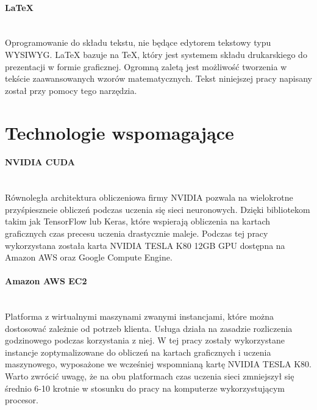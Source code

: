 \paragraph{LaTeX} \mbox{}\\
Oprogramowanie do składu tekstu, nie będące edytorem tekstowy typu WYSIWYG.
LaTeX bazuje na TeX, który jest systemem składu drukarskiego do prezentacji w
formie graficznej. Ogromną zaletą jest możliwość tworzenia w tekście zaawansowanych
wzorów matematycznych. Tekst niniejszej pracy napisany został przy pomocy tego narzędzia.

\section{Technologie wspomagające}

\paragraph{NVIDIA CUDA} \mbox{}\\
Równoległa architektura obliczeniowa firmy NVIDIA pozwala na wielokrotne
przyśpieszneie obliczeń podczas uczenia się sieci neuronowych. Dzięki bibliotekom
takim jak TensorFlow lub Keras, które wspierają obliczenia na kartach graficznych
czas precesu uczenia drastycznie maleje. Podczas tej pracy wykorzystana została
karta NVIDIA TESLA K80 12GB GPU dostępna na Amazon AWS oraz Google Compute Engine.

\paragraph{Amazon AWS EC2} \mbox{}\\
Platforma z wirtualnymi maszynami zwanymi instancjami, które można dostosować
zależnie od potrzeb klienta. Usługa działa na zasadzie rozliczenia godzinowego
podczas korzystania z niej. W tej pracy zostały wykorzystane instancje
zoptymalizowane do obliczeń na kartach graficznych i uczenia maszynowego,
wyposażone we wcześniej wspomnianą kartę NVIDIA TESLA K80. Warto
zwrócić uwagę, że na obu platformach czas uczenia sieci zmniejszył się średnio 6-10
krotnie w stosunku do pracy na komputerze wykorzystującym procesor.
